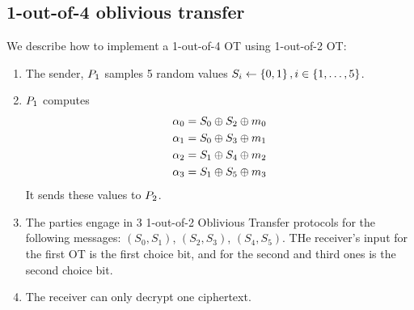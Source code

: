 \subsection{1-out-of-4 oblivious transfer}
  We describe how to implement a 1-out-of-4 OT using 1-out-of-2 OT:\@
  \begin{enumerate}
    \item
      The sender, $P_1$ samples 5 random values $S_i \gets \left\{0,1\right\}, i \in \left\{1,\dotsc, 5\right\}$.
    \item
      $P_1$ computes
      \begin{align*}
        \alpha_0 &= S_0 \oplus S_2 \oplus m_0\\
        \alpha_1 &= S_0 \oplus S_3 \oplus m_1\\
        \alpha_2 &= S_1 \oplus S_4 \oplus m_2\\
        \alpha_3 &= S_1 \oplus S_5 \oplus m_3
      \end{align*}
      It sends these values to $P_2$.
    \item
      The parties engage in 3 1-out-of-2 Oblivious Transfer protocols for the following
      messages: $(S_0, S_1)$, $(S_2, S_3)$, $(S_4, S_5)$. THe receiver's input for
      the first OT is the first choice bit, and for the second and third ones is
      the second choice bit.
    \item
      The receiver can only decrypt one ciphertext.
  \end{enumerate}
